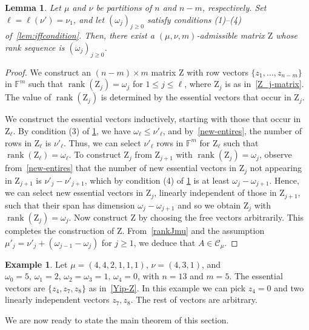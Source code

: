 \documentclass[12pt,a4paper,reqno]{amsart}
\theoremstyle{plain}
\newtheorem{lemma}[theorem]{Lemma}
\theoremstyle{definition}
\newtheorem{example}[theorem]{Example}
\newcommand{\FF}{{\mathbb{F}}}
\newcommand{\1}{\mathds{1}}
\newcommand{\C}{\mathcal{C}}
\newcommand{\Z}{\mathrm{Z}}
\DeclareMathOperator{\rk}{rank}
\begin{document}
\begin{lemma}\label{admissible-seq} Let $\mu$ and $\nu$ be partitions of $n$ and $n-m$, respectively. Set $\ell=\ell(\nu') = \nu_1$, and let $(\omega_j)_{j \geq 0}$ satisfy conditions (1)–(4) of~\cref{lem:iffcondition}. Then, there exist a $(\mu,\nu,m)$-admissible matrix $\Z$ whose rank sequence is $(\omega_j)_{j \geq 0}$.
\end{lemma}



\begin{proof}

We construct an $(n-m) \times m$ matrix $\Z$ with row vectors $\{z_1, \dots, z_{n-m}\}$ in $\FF^m$ such that $\rk(\Z_j) = \omega_j$ for $1 \leq j \leq \ell$, where $\Z_j$ is as in~\cref{Z_j-matrix}. 
 The value of $\rk(\Z_j)$ is determined by the essential vectors that occur in $\Z_j$. 

We construct the essential vectors inductively, starting with those that occur in $\Z_\ell$.  
By condition (3) of \cref{admissible-seq},  we have $\omega_\ell \leq \nu'_\ell$, and by~\cref{new-entires}, the number of rows in $\Z_\ell$ is $\nu'_\ell$. Thus, we can select $\nu'_\ell$ 
rows 
 in $\FF^m$ 
 for $\Z_\ell$
 such that $\rk(\Z_\ell) = \omega_\ell$. 
To construct $\Z_j$ from $\Z_{j+1}$ with $\rk(\Z_j) = \omega_j$, observe from~\cref{new-entires} that the number of new essential vectors in $\Z_j$ not appearing in $\Z_{j+1}$ is $\nu'_j - \nu'_{j+1}$, which by condition (4) of \cref{admissible-seq} is at least $\omega_j - \omega_{j+1}$. Hence, we can select new essential vectors in $\Z_j$, linearly independent of those in $\Z_{j+1}$, such that their span has dimension $\omega_j - \omega_{j+1}$ and so we obtain $\Z_j$ with $\rk(\Z_j)=\omega_j$. Now construct $\Z$ by choosing the free vectors  arbitrarily. This completes the construction of $\Z$. From~\cref{rankJmu} and the assumption $\mu'_j = \nu'_j + (\omega_{j-1} - \omega_j)$ for $j \geq 1$, we deduce that $A \in \C_\mu$.
\end{proof}


\begin{example}
Let $\mu = (4,4,2,1,1,1)$, $\nu = (4,3,1)$, and $\omega_0 = 5, \, \omega_1 = 2, \, \omega_2 = \omega_3 = 1, \, \omega_4 = 0$, with $n = 13$ and $m = 5$. The essential vectors are $\{z_4, z_7, z_8\}$ as in~\cref{Yip-Z}. In this example we can pick $z_4=0$ and two linearly independent vectors $z_7,z_8$. The rest of vectors are arbitrary.
\end{example}
We are now ready to state the main theorem of this section. 
\end{document}
